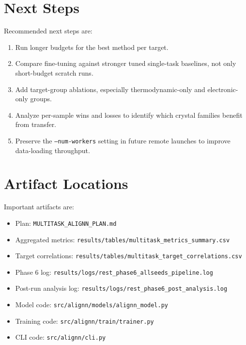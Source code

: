 \documentclass[11pt,a4paper]{article}
\begin{document}
\section{Next Steps}

Recommended next steps are:

\begin{enumerate}
  \item Run longer budgets for the best method per target.
  \item Compare fine-tuning against stronger tuned single-task baselines, not only short-budget scratch runs.
  \item Add target-group ablations, especially thermodynamic-only and electronic-only groups.
  \item Analyze per-sample wins and losses to identify which crystal families benefit from transfer.
  \item Preserve the \texttt{--num-workers} setting in future remote launches to improve data-loading throughput.
\end{enumerate}

\section{Artifact Locations}

Important artifacts are:

\begin{itemize}
  \item Plan: \texttt{MULTITASK\_ALIGNN\_PLAN.md}
  \item Aggregated metrics: \texttt{results/tables/multitask\_metrics\_summary.csv}
  \item Target correlations: \texttt{results/tables/multitask\_target\_correlations.csv}
  \item Phase 6 log: \texttt{results/logs/rest\_phase6\_allseeds\_pipeline.log}
  \item Post-run analysis log: \texttt{results/logs/rest\_phase6\_post\_analysis.log}
  \item Model code: \texttt{src/alignn/models/alignn\_model.py}
  \item Training code: \texttt{src/alignn/train/trainer.py}
  \item CLI code: \texttt{src/alignn/cli.py}
\end{itemize}
\end{document}
